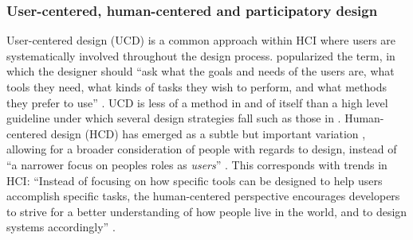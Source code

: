\documentclass[letterpaper, 12pt]{article}
\begin{document}
\subsubsection{User-centered, human-centered and participatory design}
\label{ch3-sec:user-centered-design}


User-centered design (UCD) is a common approach within HCI where users are systematically involved throughout the design process. \citet{Norman1988} popularized the term, in which the designer should ``ask what the goals and needs of the users are, what tools they need, what kinds of tasks they wish to perform, and what methods they prefer to use'' \citep[as cited in][p. 44]{El-shimy2014}. UCD is less of a method in and of itself than a high level guideline under which several design strategies fall such as those in \citet{greenberg2011sketching}. 
Human-centered design (HCD) has emerged as a subtle but important variation \citep{Norman2013}, allowing for a broader consideration of people with regards to design, instead of ``a narrower focus on peoples roles as \emph{users}'' \citep[p. 45]{Steen2011}. This corresponds with trends in HCI: ``Instead of focusing on how specific tools can be designed to help users accomplish specific tasks, the human-centered perspective encourages developers to strive for a better understanding of how people live in the world, and to design systems accordingly'' \citep[p. 45]{El-shimy2014}. 
\end{document}
